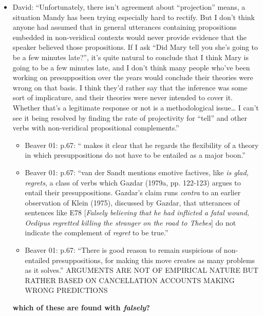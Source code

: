 \documentclass[11pt,fleqn]{article}
\newcommand{\6}{\mbox{$[\hspace*{-.6mm}[$}}
\newcommand{\9}{\mbox{$]\hspace*{-.6mm}]$}}
\begin{document}
{\begin{itemize}
\begin{itemize}
\item David: ``Unfortunately, there isn’t agreement about  “projection” means, a situation Mandy has been trying especially hard to rectify. But I don’t think anyone had assumed that in general utterances containing propositions embedded in non-veridical contexts would never provide evidence that the speaker believed those propositions. If I ask “Did Mary tell you she’s going to be a few minutes late?”, it’s quite natural to conclude that I think Mary is going to be a few minutes late, and I don’t think many people who’ve been working on presupposition over the years would conclude their theories were wrong on that basis. I think they’d rather say that the inference was some sort of implicature, and their theories were never intended to cover it. Whether that’s a legitimate response or not is a methodological issue… I can’t see it being resolved by finding the rate of projectivity for “tell” and other verbs with non-veridical propositional complements.''

\begin{itemize}

\item Beaver 01: p.67: ``\citealt[196-198]{vds88} makes it clear that he regards the flexibility of a theory in which presuppositions do not have to be entailed as a major boon.''

\item Beaver 01: p.67: ``van der Sandt mentions emotive factives, like {\em is glad, regrets}, a class of verbs which Gazdar (1979a, pp. 122-123) argues to entail their presuppositions. Gazdar's claim runs {\em contra} to an earlier observation of Klein (1975), discussed by Gazdar, that utterances of sentences like E78 [{\em Falsely believing that he had inflicted a fatal wound, Oedipus regretted killing the stranger on the road to Thebes}] do not indicate the complement of {\em regret} to be true.''

\item Beaver 01: p.67: ``There is good reason to remain suspicious of non-entailed presuppositions, for making this move creates as many problems as it solves.'' ARGUMENTS ARE NOT OF EMPIRICAL NATURE BUT RATHER BASED ON CANCELLATION ACCOUNTS MAKING WRONG PREDICTIONS

\end{itemize}

{\bf which of these are found with {\em falsely}?}

\begin{itemize}


\end{itemize}
\end{itemize}
\end{itemize}}
\end{document}

